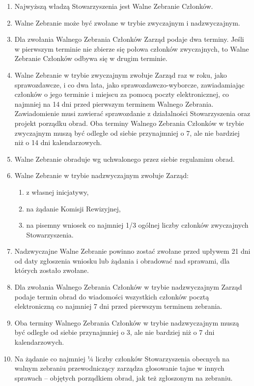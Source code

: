 \documentclass{article}
\begin{document}
\begin{enumerate}
\item
  Najwyższą władzą Stowarzyszenia jest Walne Zebranie Członków.
\item
  Walne Zebranie może być zwołane w trybie zwyczajnym i nadzwyczajnym.
\item
  Dla zwołania Walnego Zebrania Członków Zarząd podaje dwa terminy. Jeśli w pierwszym terminie nie zbierze się połowa członków zwyczajnych, to Walne Zebranie Członków odbywa się w drugim terminie.
\item
  Walne Zebranie w trybie zwyczajnym zwołuje Zarząd raz w roku, jako sprawozdawcze, i co dwa lata, jako sprawozdawczo-wyborcze, zawiadamiając członków o jego terminie i miejscu za pomocą poczty elektronicznej, co najmniej na 14 dni przed pierwszym terminem Walnego Zebrania. Zawiadomienie musi zawierać sprawozdanie z działalności Stowarzyszenia oraz projekt porządku obrad. Oba terminy Walnego Zebrania Członków w trybie zwyczajnym muszą być odległe od siebie przynajmniej o 7, ale nie bardziej niż o 14 dni kalendarzowych.
\item
  Walne Zebranie obraduje wg uchwalonego przez siebie regulaminu obrad.
\item
  Walne Zebranie w trybie nadzwyczajnym zwołuje Zarząd:
  \begin{enumerate}
  \def\labelenumii{\alph{enumii}.}
  \item
    z własnej inicjatywy,
  \item
    na żądanie Komisji Rewizyjnej,
  \item
    na pisemny wniosek co najmniej 1/3 ogólnej liczby członków zwyczajnych Stowarzyszenia.
  \end{enumerate}
\item
  Nadzwyczajne Walne Zebranie powinno zostać zwołane przed upływem 21 dni od daty zgłoszenia wniosku lub żądania i obradować nad sprawami, dla których zostało zwołane.
\item
  Dla zwołania Walnego Zebrania Członków w trybie nadzwyczajnym Zarząd podaje termin obrad do wiadomości wszystkich członków pocztą elektroniczną co najmniej 7 dni przed pierwszym terminem zebrania.
\item
  Oba terminy Walnego Zebrania Członków w trybie nadzwyczajnym muszą być odległe od siebie przynajmniej o 3, ale nie bardziej niż o 7 dni kalendarzowych.
\item
  Na żądanie co najmniej 1⁄4 liczby członków Stowarzyszenia obecnych na walnym zebraniu przewodniczący zarządza głosowanie tajne w innych sprawach -- objętych porządkiem obrad, jak też zgłoszonym na zebraniu.
\end{enumerate}
\end{document}
